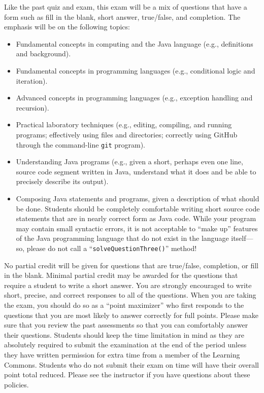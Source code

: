 \documentclass[11pt]{article}
\begin{document}
\noindent Like the past quiz and exam, this exam will be a mix of questions that
have a form such as fill in the blank, short answer, true/false, and completion.
The emphasis will be on the following topics:

\vspace*{-.05in}
\begin{itemize}

  \itemsep 0in

  \item Fundamental concepts in computing and the Java language (e.g., definitions and background).

  \item Fundamental concepts in programming languages (e.g., conditional logic and iteration).

  \item Advanced concepts in programming languages (e.g., exception handling and recursion).

  \item Practical laboratory techniques (e.g., editing, compiling, and running programs; effectively using files and
    directories; correctly using GitHub through the command-line {\tt git} program).

  \item Understanding Java programs (e.g., given a short, perhaps even one line, source code segment written in Java,
    understand what it does and be able to precisely describe its output).

  \item Composing Java statements and programs, given a description of what should be done. Students should be completely
    comfortable writing short source code statements that are in nearly correct form as Java code. While your program may
    contain small syntactic errors, it is not acceptable to ``make up'' features of the Java programming language that do
    not exist in the language itself---so, please do not call a ``{\tt solveQuestionThree()}'' method!

\end{itemize}

\noindent No partial credit will be given for questions that are true/false,
completion, or fill in the blank. Minimal partial credit may be awarded for the
questions that require a student to write a short answer. You are strongly
encouraged to write short, precise, and correct responses to all of the
questions. When you are taking the exam, you should do so as a ``point
maximizer'' who first responds to the questions that you are most likely to
answer correctly for full points. Please make sure that you review the past
assessments so that you can comfortably answer their questions. Students should
keep the time limitation in mind as they are absolutely required to submit the
examination at the end of the period unless they have written permission for
extra time from a member of the Learning Commons. Students who do not submit
their exam on time will have their overall point total reduced. Please see the
instructor if you have questions about these policies.
\end{document}
